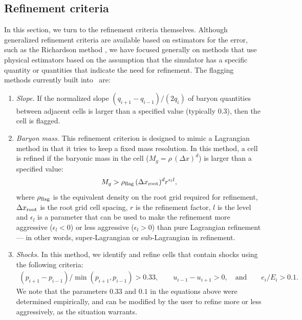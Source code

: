 \subsection{Refinement criteria}
\label{sec:refinement_criteria}

In this section, we turn to the refinement criteria themselves.
Although generalized refinement criteria are available based on
estimators for the error, such as the Richardson method \citep{AtkinsonHan2004}, we have focused generally on methods that use physical estimators based on the assumption that the simulator has a specific quantity or quantities that indicate the need for refinement.  The flagging methods currently built into \enzo\ are:

\begin{enumerate}

\item{\em Slope.}  If the normalized slope $(q_{i+1} - q_{i-1})/ (2 q_i)$ of baryon quantities between adjacent cells is larger than a specified value (typically 0.3), then the cell is flagged.

\item{\em Baryon mass.}  This refinement criterion is designed to
  mimic a Lagrangian method in that it tries to keep a fixed mass
  resolution.  In this method, a cell is refined if the baryonic mass
  in the cell ($M_g = \rho\, (\Delta x)^d$) is larger than a specified value:
\begin{equation}
M_g > \rho_{\rm flag}\, (\Delta x_{\rm root})^d r^{\epsilon_l l},
\end{equation}
where $\rho_{\rm flag}$ is the equivalent density on the root grid
required for refinement, $\Delta x_{\rm root}$ is the root grid cell
spacing, $r$ is the refinement factor, $l$ is the level and
$\epsilon_l$ is a parameter that can be used to make the refinement
more aggressive ($\epsilon_l < 0$) or less aggressive ($\epsilon_l >
0$) than pure Lagrangian refinement --- in other words,
super-Lagrangian or sub-Lagrangian in refinement.

\item{\em Shocks.}  In this method, we identify and refine cells that contain shocks using the following criteria:
\begin{eqnarray}
(p_{i+1} - p_{i-1})/\min(p_{i+1}, p_{i-1}) > 0.33,  \qquad
u_{i-1} - u_{i+1} > 0, \quad\text{and} \qquad
e_i / E_i > 0.1.  \nonumber
\end{eqnarray}
We note that the parameters $0.33$ and $0.1$ in the equations above were determined empirically, and can be modified by the user to refine more or less aggressively, as the situation warrants.


\end{enumerate}
